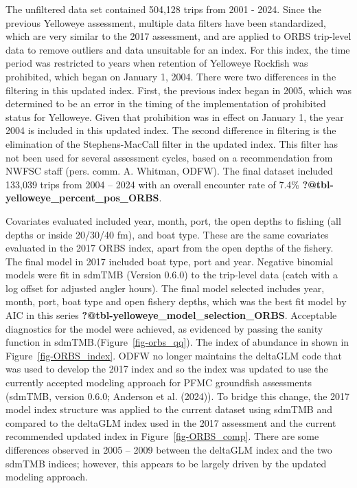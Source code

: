 \documentclass[
]{scrartcl}
\begin{document}
The unfiltered data set contained 504,128 trips from 2001 - 2024. Since
the previous Yelloweye assessment, multiple data filters have been
standardized, which are very similar to the 2017 assessment, and are
applied to ORBS trip-level data to remove outliers and data unsuitable
for an index. For this index, the time period was restricted to years
when retention of Yelloweye Rockfish was prohibited, which began on
January 1, 2004. There were two differences in the filtering in this
updated index. First, the previous index began in 2005, which was
determined to be an error in the timing of the implementation of
prohibited status for Yelloweye. Given that prohibition was in effect on
January 1, the year 2004 is included in this updated index. The second
difference in filtering is the elimination of the Stephens-MacCall
filter in the updated index. This filter has not been used for several
assessment cycles, based on a recommendation from NWFSC staff (pers.
comm. A. Whitman, ODFW). The final dataset included 133,039 trips from
2004 -- 2024 with an overall encounter rate of 7.4\%
\textbf{?@tbl-yelloweye\_percent\_pos\_ORBS}.

Covariates evaluated included year, month, port, the open depths to
fishing (all depths or inside 20/30/40 fm), and boat type. These are the
same covariates evaluated in the 2017 ORBS index, apart from the open
depths of the fishery. The final model in 2017 included boat type, port
and year. Negative binomial models were fit in sdmTMB (Version 0.6.0) to
the trip-level data (catch with a log offset for adjusted angler hours).
The final model selected includes year, month, port, boat type and open
fishery depths, which was the best fit model by AIC in this series
\textbf{?@tbl-yelloweye\_model\_selection\_ORBS}. Acceptable diagnostics
for the model were achieved, as evidenced by passing the sanity function
in sdmTMB.(Figure~\ref{fig-orbs_qq}). The index of abundance in shown in
Figure~\ref{fig-ORBS_index}. ODFW no longer maintains the deltaGLM code
that was used to develop the 2017 index and so the index was updated to
use the currently accepted modeling approach for PFMC groundfish
assessments (sdmTMB, version 0.6.0; Anderson et al. (2024)). To bridge
this change, the 2017 model index structure was applied to the current
dataset using sdmTMB and compared to the deltaGLM index used in the 2017
assessment and the current recommended updated index in
Figure~\ref{fig-ORBS_comp}. There are some differences observed in 2005
-- 2009 between the deltaGLM index and the two sdmTMB indices; however,
this appears to be largely driven by the updated modeling approach.
\end{document}
